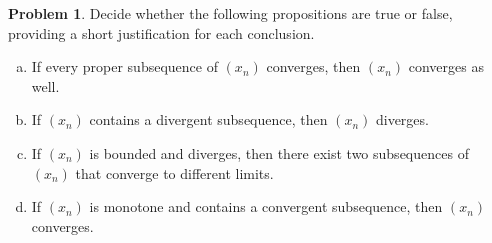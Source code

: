 \documentclass{amsart}
\newcommand{\+}[1]{\ensuremath{\mathbf{#1}}}
\theoremstyle{definition}
\newtheorem{prob}{Problem}
\begin{document}
\begin{prob}
Decide whether the following propositions are true or false, providing a short justification for each conclusion.
  \vspace{2mm}
 \begin{enumerate}[(a)]
  \item If every proper subsequence of $(x_n)$ converges, then $(x_n)$ converges as well.
  \vspace{2mm}
  \item If $(x_n)$ contains a divergent subsequence, then $(x_n)$ diverges.
  \vspace{2mm}
  \item If $(x_n)$ is bounded and diverges, then there exist two subsequences of $(x_n)$ that converge 
  to different limits.
  \vspace{2mm}
  \item If $(x_n)$ is monotone and contains a convergent subsequence, then $(x_n)$ converges.
 \end{enumerate}

\end{prob}
\end{document}
